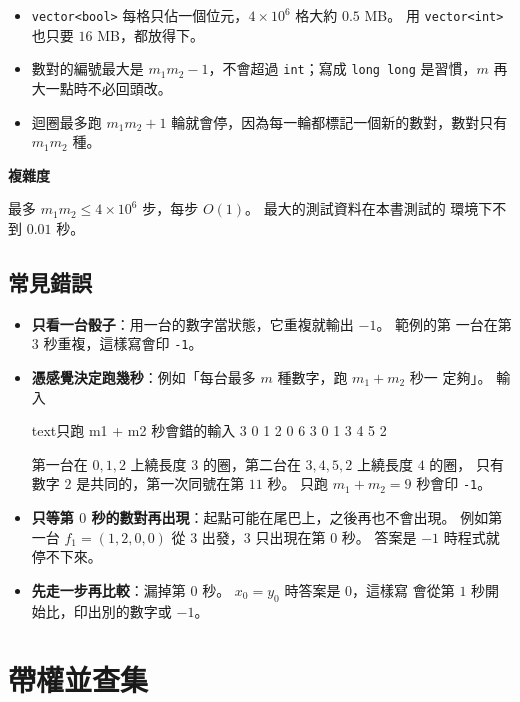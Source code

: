 
\begin{itemize}
\item \texttt{vector<bool>} 每格只佔一個位元，$4 \times 10^6$ 格大約 $0.5$ MB。
用 \texttt{vector<int>} 也只要 $16$ MB，都放得下。
\item 數對的編號最大是 $m_1 m_2 - 1$，不會超過 \texttt{int}；寫成
\texttt{long long} 是習慣，$m$ 再大一點時不必回頭改。
\item 迴圈最多跑 $m_1 m_2 + 1$ 輪就會停，因為每一輪都標記一個新的數對，數對只有
$m_1 m_2$ 種。
\end{itemize}

\textbf{複雜度}

最多 $m_1 m_2 \le 4 \times 10^6$ 步，每步 $O(1)$。 最大的測試資料在本書測試的
環境下不到 $0.01$ 秒。

\subsection{常見錯誤}

\begin{itemize}
\item \textbf{只看一台骰子}：用一台的數字當狀態，它重複就輸出 $-1$。 範例的第
一台在第 $3$ 秒重複，這樣寫會印 \texttt{-1}。
\item \textbf{憑感覺決定跑幾秒}：例如「每台最多 $m$ 種數字，跑 $m_1 + m_2$ 秒一
定夠」。 輸入
\begin{code}{text}{只跑 m1 + m2 秒會錯的輸入}
3 0
1 2 0
6 3
0 1 3 4 5 2
\end{code}
第一台在 $0, 1, 2$ 上繞長度 $3$ 的圈，第二台在 $3, 4, 5, 2$ 上繞長度 $4$ 的圈，
只有數字 $2$ 是共同的，第一次同號在第 $11$ 秒。 只跑 $m_1 + m_2 = 9$ 秒會印
\texttt{-1}。
\item \textbf{只等第 $0$ 秒的數對再出現}：起點可能在尾巴上，之後再也不會出現。
例如第一台 $f_1 = (1, 2, 0, 0)$ 從 $3$ 出發，$3$ 只出現在第 $0$ 秒。 答案是 $-1$
時程式就停不下來。
\item \textbf{先走一步再比較}：漏掉第 $0$ 秒。 $x_0 = y_0$ 時答案是 $0$，這樣寫
會從第 $1$ 秒開始比，印出別的數字或 $-1$。
\end{itemize}

\section{帶權並查集}
\label{sec:dsu-parity}

